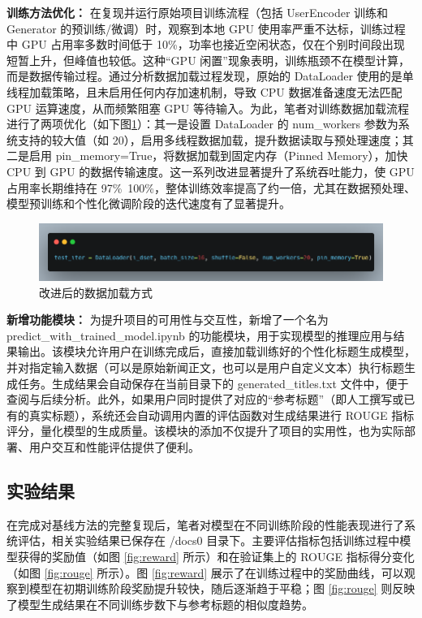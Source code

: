 \documentclass[10pt,a4paper]{article}
\begin{document}
\textbf{训练方法优化：}
在复现并运行原始项目训练流程（包括 UserEncoder 训练和 Generator 的预训练/微调）时，观察到本地 GPU 使用率严重不达标，训练过程中 GPU 占用率多数时间低于 10\%，功率也接近空闲状态，仅在个别时间段出现短暂上升，但峰值也较低。这种“GPU 闲置”现象表明，训练瓶颈不在模型计算，而是数据传输过程。通过分析数据加载过程发现，原始的 DataLoader 使用的是单线程加载策略，且未启用任何内存加速机制，导致 CPU 数据准备速度无法匹配 GPU 运算速度，从而频繁阻塞 GPU 等待输入。为此，笔者对训练数据加载流程进行了两项优化（如下图\ref{fig:data_loader}）：其一是设置 DataLoader 的 num\_workers 参数为系统支持的较大值（如 20），启用多线程数据加载，提升数据读取与预处理速度；其二是启用 pin\_memory=True，将数据加载到固定内存（Pinned Memory），加快 CPU 到 GPU 的数据传输速度。这一系列改进显著提升了系统吞吐能力，使 GPU 占用率长期维持在 97\%~100\%，整体训练效率提高了约一倍，尤其在数据预处理、模型预训练和个性化微调阶段的迭代速度有了显著提升。

\begin{figure}[H]
  \centering
  \includegraphics[width=15cm]{fig/dataloader.png}
  \caption{改进后的数据加载方式}\label{fig:data_loader}
\end{figure}


\textbf{新增功能模块：}
为提升项目的可用性与交互性，新增了一个名为 predict\_with\_trained\_model.ipynb 的功能模块，用于实现模型的推理应用与结果输出。该模块允许用户在训练完成后，直接加载训练好的个性化标题生成模型，并对指定输入数据（可以是原始新闻正文，也可以是用户自定义文本）执行标题生成任务。生成结果会自动保存在当前目录下的 generated\_titles.txt 文件中，便于查阅与后续分析。此外，如果用户同时提供了对应的“参考标题”（即人工撰写或已有的真实标题），系统还会自动调用内置的评估函数对生成结果进行 ROUGE 指标评分，量化模型的生成质量。该模块的添加不仅提升了项目的实用性，也为实际部署、用户交互和性能评估提供了便利。

\subsection{实验结果}
在完成对基线方法的完整复现后，笔者对模型在不同训练阶段的性能表现进行了系统评估，相关实验结果已保存在 /docs0 目录下。主要评估指标包括训练过程中模型获得的奖励值（如图 \ref{fig:reward} 所示）和在验证集上的 ROUGE 指标得分变化（如图 \ref{fig:rouge} 所示）。图 \ref{fig:reward} 展示了在训练过程中的奖励曲线，可以观察到模型在初期训练阶段奖励提升较快，随后逐渐趋于平稳；图 \ref{fig:rouge} 则反映了模型生成结果在不同训练步数下与参考标题的相似度趋势。
\end{document}
